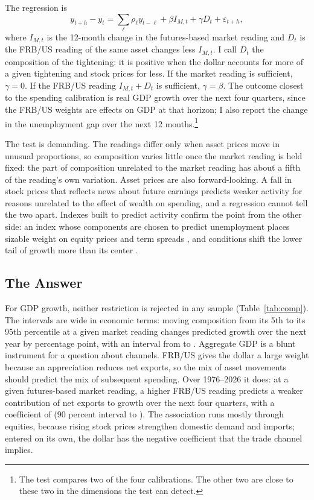 The regression is
\begin{equation}\label{eq:test}
y_{t+h}-y_t=\textstyle\sum_\ell \rho_\ell y_{t-\ell}+\beta I_{M,t}+\gamma D_t+\varepsilon_{t+h},
\end{equation}
where $I_{M,t}$ is the 12-month change in the futures-based market reading and $D_t$ is the FRB/US reading of the same asset changes less $I_{M,t}$. I call $D_t$ the composition of the tightening: it is positive when the dollar accounts for more of a given tightening and stock prices for less. If the market reading is sufficient, $\gamma=0$. If the FRB/US reading $I_{M,t}+D_t$ is sufficient, $\gamma=\beta$. The outcome closest to the spending calibration is real GDP growth over the next four quarters, since the FRB/US weights are effects on GDP at that horizon; I also report the change in the unemployment gap over the next 12 months.\footnote{The test compares two of the four calibrations. The other two are close to these two in the dimensions the test can detect.}

The test is demanding. The readings differ only when asset prices move in unusual proportions, so composition varies little once the market reading is held fixed: the part of composition unrelated to the market reading has about a fifth of the reading's own variation. Asset prices are also forward-looking. A fall in stock prices that reflects news about future earnings predicts weaker activity for reasons unrelated to the effect of wealth on spending, and a regression cannot tell the two apart. Indexes built to predict activity confirm the point from the other side: an index whose components are chosen to predict unemployment places sizable weight on equity prices and term spreads \citep{kiley2020ml}, and conditions shift the lower tail of growth more than its center \citep{adrian2019}.

\subsection{The Answer}\label{sec:answer}
For GDP growth, neither restriction is rejected in any sample (Table~\ref{tab:comp}). The intervals are wide in economic terms: moving composition from its 5th to its 95th percentile at a given market reading changes predicted growth over the next year by  percentage point, with an interval from  to . 
Aggregate GDP is a blunt instrument for a question about channels. FRB/US gives the dollar a large weight because an appreciation reduces net exports, so the mix of asset movements should predict the mix of subsequent spending. Over 1976--2026 it does: at a given futures-based market reading, a higher FRB/US reading predicts a weaker contribution of net exports to growth over the next four quarters, with a coefficient of  (90 percent interval  to ). The association runs mostly through equities, because rising stock prices strengthen domestic demand and imports; entered on its own, the dollar has the negative coefficient that the trade channel implies.

